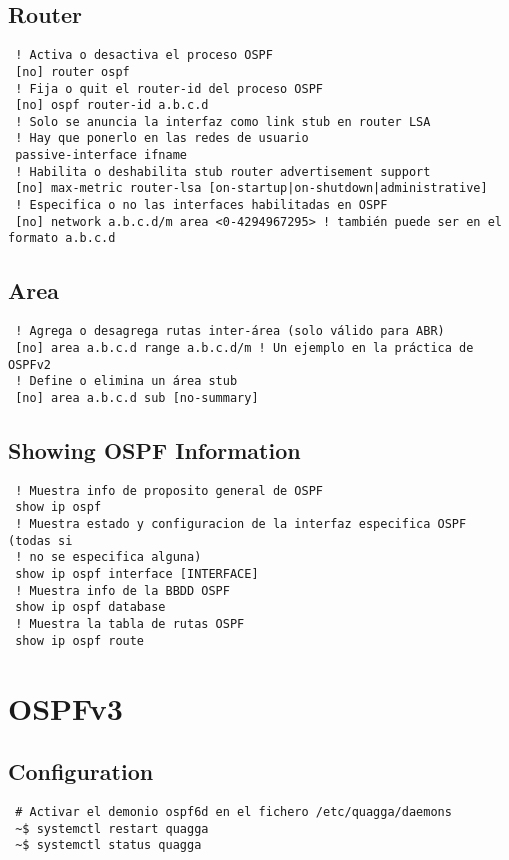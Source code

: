 \documentclass{article}
\begin{document}
\subsection{Router}
\begin{verbatim}
 ! Activa o desactiva el proceso OSPF
 [no] router ospf
 ! Fija o quit el router-id del proceso OSPF
 [no] ospf router-id a.b.c.d
 ! Solo se anuncia la interfaz como link stub en router LSA
 ! Hay que ponerlo en las redes de usuario
 passive-interface ifname
 ! Habilita o deshabilita stub router advertisement support
 [no] max-metric router-lsa [on-startup|on-shutdown|administrative]
 ! Especifica o no las interfaces habilitadas en OSPF
 [no] network a.b.c.d/m area <0-4294967295> ! también puede ser en el formato a.b.c.d
\end{verbatim}

\subsection{Area}
\begin{verbatim}
 ! Agrega o desagrega rutas inter-área (solo válido para ABR)
 [no] area a.b.c.d range a.b.c.d/m ! Un ejemplo en la práctica de OSPFv2
 ! Define o elimina un área stub
 [no] area a.b.c.d sub [no-summary]
\end{verbatim}

\subsection{Showing OSPF Information}
\begin{verbatim}
 ! Muestra info de proposito general de OSPF
 show ip ospf
 ! Muestra estado y configuracion de la interfaz especifica OSPF (todas si
 ! no se especifica alguna)
 show ip ospf interface [INTERFACE]
 ! Muestra info de la BBDD OSPF
 show ip ospf database
 ! Muestra la tabla de rutas OSPF
 show ip ospf route
\end{verbatim}


\section{OSPFv3}
\subsection{Configuration}
\begin{verbatim}
 # Activar el demonio ospf6d en el fichero /etc/quagga/daemons
 ~$ systemctl restart quagga
 ~$ systemctl status quagga
\end{verbatim}
\end{document}
